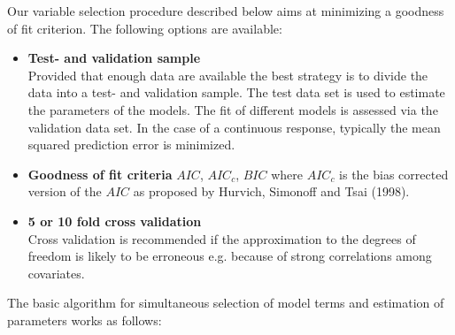 \documentclass[11pt,a4paper,twoside]{bayesxarticle}
\begin{document}
Our variable selection procedure described below aims at minimizing a goodness of fit criterion. The following
options are available:
\begin{itemize}
\item {\bf Test- and validation sample} \\
Provided that enough data are available the best strategy is to divide the data into a test- and validation
sample. The test data set is used to estimate the parameters of the models. The fit of different models
is assessed via the validation data set. In the case of a continuous response, typically the mean squared prediction
error is minimized.
\item {\bf Goodness of fit criteria}  $AIC$, $AIC_{c}$, $BIC$ where $AIC_c$ is the bias corrected version of the $AIC$ as
proposed by Hurvich, Simonoff and Tsai (1998).
\item {\bf 5 or 10 fold cross validation} \\
Cross validation is recommended
if the approximation to the degrees of freedom is likely to be erroneous e.g. because of strong correlations among covariates.
\end{itemize}

The basic algorithm for simultaneous selection of model terms and
estimation of parameters works as follows:
\end{document}
